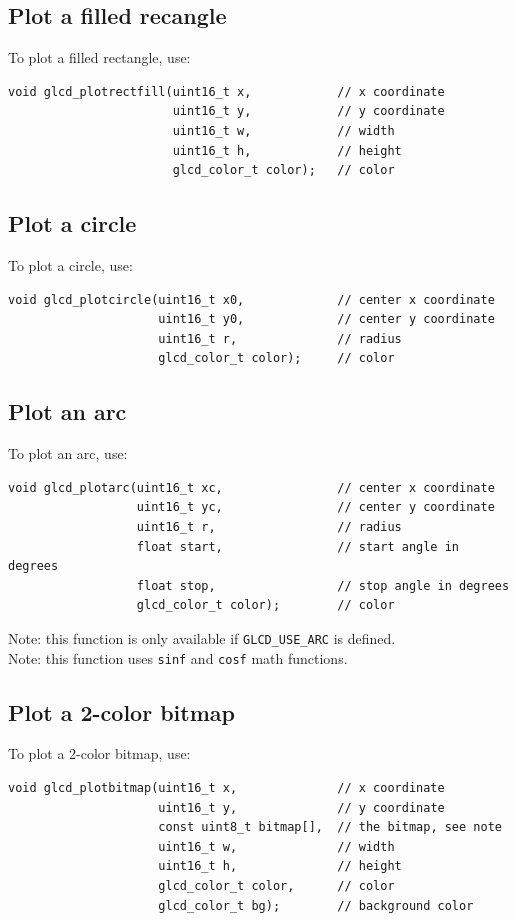 \documentclass[12pt]{article}
\begin{document}
\subsection{Plot a filled recangle}
To plot a filled rectangle, use:
\begin{lstlisting}
void glcd_plotrectfill(uint16_t x,            // x coordinate
                       uint16_t y,            // y coordinate
                       uint16_t w,            // width
                       uint16_t h,            // height
                       glcd_color_t color);   // color
\end{lstlisting}

\subsection{Plot a circle}
To plot a circle, use:
\begin{lstlisting}
void glcd_plotcircle(uint16_t x0,             // center x coordinate
                     uint16_t y0,             // center y coordinate
                     uint16_t r,              // radius
                     glcd_color_t color);     // color
\end{lstlisting}

\subsection{Plot an arc}
To plot an arc, use:
\begin{lstlisting}
void glcd_plotarc(uint16_t xc,                // center x coordinate
                  uint16_t yc,                // center y coordinate
                  uint16_t r,                 // radius
                  float start,                // start angle in degrees
                  float stop,                 // stop angle in degrees
                  glcd_color_t color);        // color
\end{lstlisting}

Note: this function is only available if \lstinline|GLCD_USE_ARC| is defined.\\
Note: this function uses \lstinline|sinf| and \lstinline|cosf| math functions.

\subsection{Plot a 2-color bitmap}
To plot a 2-color bitmap, use:
\begin{lstlisting}
void glcd_plotbitmap(uint16_t x,              // x coordinate
                     uint16_t y,              // y coordinate
                     const uint8_t bitmap[],  // the bitmap, see note
                     uint16_t w,              // width
                     uint16_t h,              // height
                     glcd_color_t color,      // color
                     glcd_color_t bg);        // background color
\end{lstlisting}
\end{document}
